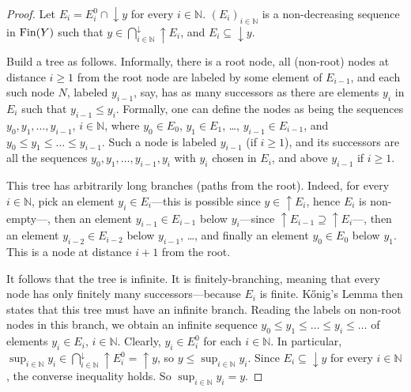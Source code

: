 \documentclass{LMCS}
\newcommand\nat{\mathbb{N}}
\newcommand\upc{\mathop{\uparrow}\nolimits}
\newcommand\dc{\mathop{\downarrow}\nolimits}
\begin{document}
\begin{proof}
  Let $E_i = E^0_i \cap \dc y$ for every $i \in \nat$.  ${(E_i)}_{i
    \in \nat}$ is a non-decreasing sequence in $\mathop{\text{Fin}} (Y)$ such that $y
  \in \bigcap_{i \in \nat}^\downarrow \upc E_i$, and $E_i \subseteq
  \dc y$.

  Build a tree as follows.  Informally, there is a root node, all
  (non-root) nodes at distance $i \geq 1$ from the root node are
  labeled by some element of $E_{i-1}$, and each such node $N$,
  labeled $y_{i-1}$, say, has as many successors as there are elements
  $y_i$ in $E_i$ such that $y_{i-1} \leq y_i$.  Formally, one can
  define the nodes as being the sequences $y_0, y_1, \ldots, y_{i-1}$,
  $i \in \nat$, where $y_0 \in E_0$, $y_1 \in E_1$, \ldots, $y_{i-1}
  \in E_{i-1}$, and $y_0 \leq y_1 \leq \ldots \leq y_{i-1}$.  Such a
  node is labeled $y_{i-1}$ (if $i \geq 1$), and its successors are
  all the sequences $y_0, y_1, \ldots, y_{i-1}, y_i$ with $y_i$ chosen
  in $E_i$, and above $y_{i-1}$ if $i \geq 1$.

  This tree has arbitrarily long branches (paths from the root).
  Indeed, for every $i \in \nat$, pick an element $y_i \in E_i$---this
  is possible since $y \in \upc E_i$, hence $E_i$ is non-empty---,
  then an element $y_{i-1} \in E_{i-1}$ below $y_i$---since $\upc
  E_{i-1} \supseteq \upc E_i$---, then an element $y_{i-2} \in
  E_{i-2}$ below $y_{i-1}$, \ldots, and finally an element $y_0 \in
  E_0$ below $y_1$.  This is a node at distance $i+1$ from the root.

  It follows that the tree is infinite.  It is finitely-branching,
  meaning that every node has only finitely many successors---because
  $E_i$ is finite.  K\H{o}nig's Lemma then states that this tree must
  have an infinite branch.  Reading the labels on non-root nodes in
  this branch, we obtain an infinite sequence $y_0 \leq y_1 \leq
  \ldots \leq y_i \leq \ldots$ of elements $y_i \in E_i$, $i \in
  \nat$.  Clearly, $y_i \in E^0_i$ for each $i \in \nat$.  In
  particular, $\sup_{i \in \nat} y_i \in \bigcap_{i \in
    \nat}^\downarrow \upc E^0_i = \upc y$, so $y \leq \sup_{i \in
    \nat} y_i$.  Since $E_i \subseteq \dc y$ for every $i \in \nat$,
  the converse inequality holds.  So $\sup_{i \in \nat} y_i = y$.
\end{proof}
\end{document}
